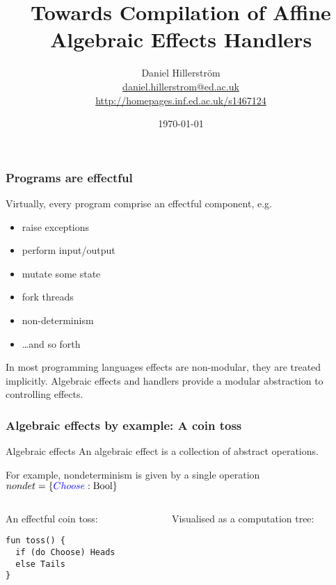 \documentclass[10pt,compress]{beamer}
\author[Daniel Hillerström]{Daniel Hillerström\\\footnotesize{\href{mailto:daniel.hillerstrom@ed.ac.uk}{daniel.hillerstrom@ed.ac.uk}}\\\href{http://homepages.inf.ed.ac.uk/s1467124}{http://homepages.inf.ed.ac.uk/s1467124}}
\title{Towards Compilation of Affine Algebraic Effects Handlers}
\institute{The University of Edinburgh}
\date{\today}
\begin{document}
\begin{frame}[plain]
  \maketitle
\end{frame}

\begin{frame}
  \frametitle{Programs are effectful}
Virtually, every program comprise an \alert<1->{effectful} component, e.g.
\begin{itemize}
  \item raise exceptions
  \item perform input/output
  \item mutate some state
  \item fork threads
  \item non-determinism
  \item \dots and so forth 
\end{itemize}
In most programming languages effects are non-modular, they are treated implicitly.
Algebraic effects and handlers provide a modular abstraction to controlling effects.
\end{frame}

\begin{frame}[fragile]
  \frametitle{Algebraic effects by example: A coin toss}
  \begin{block}{Algebraic effects}
    An algebraic effect is a collection of abstract operations.    
  \end{block}
For example, nondeterminism is given by a single operation $nondet = \{{\color{blue}{Choose}} : \text{Bool}\}$
\vspace{1cm}
\begin{columns}
\begin{column}{0.5\textwidth}
An effectful coin toss:
\begin{lstlisting}
fun toss() {
  if (do Choose) Heads
  else Tails
} 
\end{lstlisting}
\end{column}
\begin{column}{0.5\textwidth}
Visualised as a computation tree:
\end{column}
\end{columns}
\end{frame}
\end{document}
